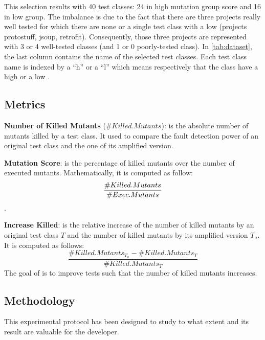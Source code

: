 This selection results with 40 test classes: 24 in high mutation group score and 16 in low \ms group. 
The imbalance is due to the fact that there are three projects really well tested for which there are none or a single test class with a low \ms (projects protostuff, jsoup, retrofit).
Consequently, those three projects are represented with 3 or 4 well-tested classes (and 1 or 0 poorly-tested class). 
In \autoref{tab:dataset}, the last column contains the name of the selected test classes. 
Each test class name is indexed by a ``h'' or a ``l'' which means respectively that the class have a high \ms or a low \ms.

\subsection{Metrics}	
\label{subsec:test-improvement:experiment-protocol:metrics}

\textbf{Number of Killed Mutants} ($\#Killed.Mutants$): is the absolute number of mutants killed by a test class. 
It used to compare the fault detection power of an original test class and the one of its amplified version.

\textbf{Mutation Score}: is the percentage of killed mutants over the number of executed mutants.
 Mathematically, it is computed as follow: $$\frac{\#Killed.Mutants}{\#Exec.Mutants} \time 100$$.

\textbf{Increase Killed}: is the relative increase of the number of killed mutants by an original test class $T$ and the number of killed mutants by its amplified version $T_a$.
It is computed as follows:
$$\frac{\#Killed.Mutants_{T_a} - \#Killed.Mutants_T}{\#Killed.Mutants_T}$$
The goal of \dspot is to improve tests such that the number of killed mutants increases.

\subsection{Methodology}
\label{subsec:test-improvement:experiment-protocol:methodology}

This experimental protocol has been designed to study to what extent \dspot and its result are valuable for the developer.

